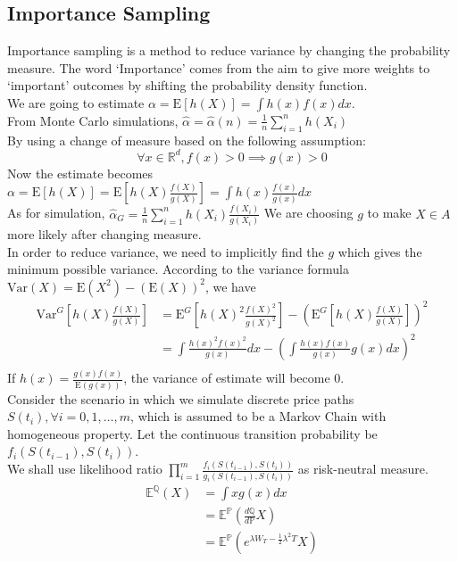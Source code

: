 \subsection{Importance Sampling}
Importance sampling is a method to reduce variance by changing the probability measure. The word `Importance' comes from the aim to give more weights to `important' outcomes by shifting the probability density function.\\
We are going to estimate $\displaystyle \alpha = \mathrm{E}[h(X)] = \int h(x)f(x) dx$.\\
From Monte Carlo simulations, $\displaystyle \hat{\alpha} = \hat{\alpha}(n) = \frac{1}{n} \sum_{i=1}^{n} h(X_{i})$\\
By using a change of measure based on the following assumption:
$$\forall x \in \mathbb{R}^{d}, f(x) > 0 \implies g(x) > 0$$
Now the estimate becomes $\displaystyle \alpha = \mathrm{E}[h(X)] = \mathrm{E}[h(X)\frac{f(X)}{g(X)}] = \int h(x)\frac{f(x)}{g(x)} dx$\\
As for simulation, $\displaystyle \hat{\alpha}_{G} = \frac{1}{n} \sum_{i=1}^{n} h(X_{i})\frac{f(X_{i})}{g(X_{i})}$
We are choosing $g$ to make ${X \in A}$ more likely after changing measure.\\
In order to reduce variance, we need to implicitly find the $g$ which gives the minimum possible variance. According to the variance formula $\mathrm{Var}(X) = \mathrm{E}(X^{2}) - (\mathrm{E}(X))^{2} $, we have
\begin{equation*}
\begin{split}
\mathrm{Var}^{G}[h(X)\frac{f(X)}{g(X)}] &= \mathrm{E}^{G}[h(X)^{2}\frac{f(X)^{2}}{g(X)^{2}}] - (\mathrm{E}^{G}[h(X)\frac{f(X)}{g(X)}])^{2}\\
&= \int \frac{h(x)^{2}f(x)^{2}}{g(x)} dx - (\int \frac{h(x)f(x)}{g(x)}g(x) dx)^{2}\\
\end{split}
\end{equation*}
If $\displaystyle h(x) = \frac{g(x)f(x)}{\mathrm{E}(g(x))}$, the variance of estimate will become 0.\\
Consider the scenario in which we simulate discrete price paths $S(t_{i}), \forall i = 0, 1, \dots, m$, which is assumed to be a Markov Chain with homogeneous property. Let the continuous transition probability be $f_{i}(S(t_{i-1}),S(t_{i}))$.\\[3mm]
We shall use likelihood ratio $\displaystyle \prod_{i=1}^{m} \frac{f_{i}(S(t_{i-1}),S(t_{i}))}{g_{i}(S(t_{i-1}),S(t_{i}))}$ as risk-neutral measure.
\begin{equation*}
\begin{split}
\mathbb{E}^{\mathbb{Q}}(X) 
&= \int x g(x) dx\\
&= \mathbb{E}^{\mathbb{P}}(\frac{d\mathbb{Q}}{d\mathbb{P}}X) \\
&= \mathbb{E}^{\mathbb{P}}(e^{\lambda W_{T} - \frac{1}{2}\lambda^{2}T}X) \\[7mm]
\end{split}
\end{equation*}
